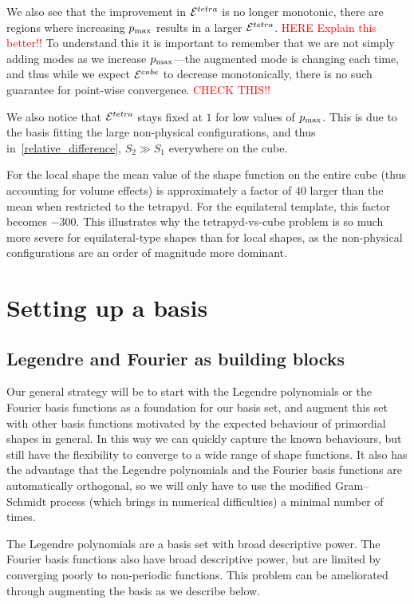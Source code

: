     We also see that the improvement in $\mathcal{E}^{tetra}$ is no longer
    monotonic, there are regions where increasing $p_\text{max}$ results in
    a larger $\mathcal{E}^{tetra}$. \textcolor{red}{HERE Explain this better!!}
    To understand this it is important to remember that we are not simply
    adding modes as we increase $p_\text{max}$---the augmented mode is changing
    each time, and thus while we expect $\mathcal{E}^{cube}$ to decrease monotonically,
    there is no such guarantee for point-wise convergence. \textcolor{red}{CHECK THIS!!}


    We also notice that $\mathcal{E}^{tetra}$ stays fixed at $1$ for low values of $p_\text{max}$.
    This is due to the basis fitting the large non-physical configurations,
    and thus in~\eqref{relative_difference}, $S_2 \gg S_1$ everywhere on the cube.

    For the local shape the mean value of the shape function on the entire cube
    (thus accounting for volume effects) is approximately a factor of $40$ larger than the mean
    when restricted to the tetrapyd. For the equilateral template, this factor becomes $-300$.
    This illustrates why the tetrapyd-vs-cube problem is so much more severe for equilateral-type
    shapes than for local shapes, as the non-physical configurations are an order of magnitude
    more dominant.
\section{Setting up a basis}
    \subsection{Legendre and Fourier as building blocks}
    Our general strategy will be to start with the Legendre polynomials
    or the Fourier basis functions as a foundation for our basis set,
    and augment this set with other basis functions motivated by the
    expected behaviour of primordial shapes in general.
    In this way we can quickly capture the known behaviours,
    but still have the flexibility to converge to a wide range
    of shape functions. It also has the advantage that the Legendre polynomials
    and the Fourier basis functions are automatically orthogonal,
    so we will only have to use the modified Gram–Schmidt process
    (which brings in numerical difficulties)
    a minimal number of times.


    The Legendre polynomials are a basis set with broad descriptive power.
    The Fourier basis functions also have broad descriptive power,
    but are limited by converging poorly to non-periodic functions.
    This problem can be ameliorated through augmenting the basis as we describe below.
